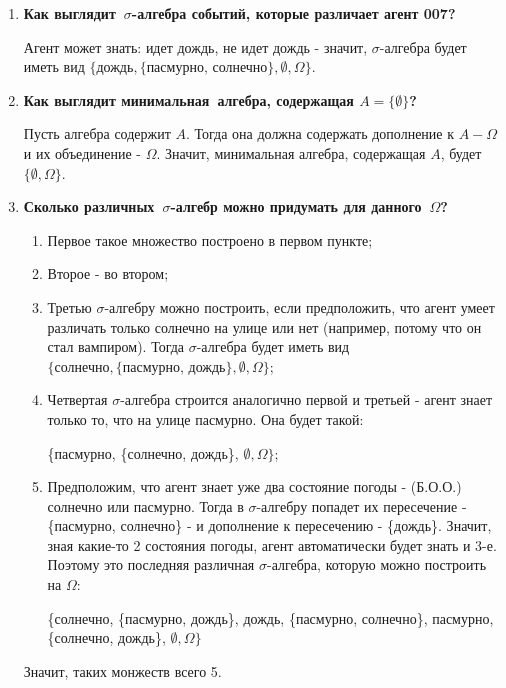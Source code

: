 \documentclass{article}
\begin{document}
\begin{enumerate}
\item \textbf{Как выглядит $\sigma$-алгебра событий, которые различает агент 007?}

Агент может знать: идет дождь, не идет дождь - значит, $\sigma$-алгебра будет иметь вид $\{\text{дождь}, \{\text{пасмурно, солнечно}\}, \emptyset, \Omega\}$.

\item \textbf{Как выглядит минимальная алгебра, содержащая $A=\{\emptyset\}$?}

Пусть алгебра содержит $A$. Тогда она должна содержать дополнение к $A - \Omega$ и их объединение - $\Omega$. 
Значит, минимальная алгебра, содержащая $A$, будет $\{\emptyset, \Omega\}$.

\item \textbf{Сколько различных $\sigma$-алгебр можно придумать для данного $\Omega$?}

\begin{enumerate}
\item Первое такое множество построено в первом пункте;
\item Второе - во втором;
\item Третью $\sigma$-алгебру можно построить, если предположить, что агент умеет различать только солнечно на улице или нет (например, потому что он стал вампиром). Тогда $\sigma$-алгебра будет иметь вид $\{\text{солнечно}, \{\text{пасмурно, дождь}\}, \emptyset, \Omega\}$;
\item Четвертая $\sigma$-алгебра строится аналогично первой и третьей - агент знает только то, что на улице пасмурно. Она будет такой:

\{пасмурно, \{солнечно, дождь\}, $\emptyset, \Omega\}$;
\item Предположим, что агент знает уже два состояние погоды - (Б.О.О.) солнечно или пасмурно. Тогда в $\sigma$-алгебру попадет их пересечение - \{пасмурно, солнечно\} - и дополнение к пересечению - \{дождь\}. Значит, зная какие-то 2 состояния погоды, агент автоматически будет знать и 3-е. Поэтому это последняя различная $\sigma$-алгебра, которую можно построить на $\Omega:$ 

\{солнечно, \{пасмурно, дождь\}, дождь, \{пасмурно, солнечно\}, пасмурно, \{солнечно, дождь\}, $\emptyset, \Omega\}$
\end{enumerate}
Значит, таких монжеств всего 5.
\end{enumerate}
\end{document}
